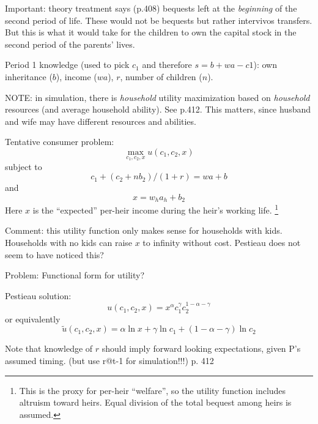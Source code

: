 \documentclass{article}
\begin{document}
Important:
theory treatment says (p.408) bequests left at the \emph{beginning} of the second period of life.
These would not be bequests but rather intervivos transfers.
But this is what it would take for the children to own the capital stock in the second period of the parents' lives.


Period 1 knowledge (used to pick $c_{1}$ and therefore $s = b+wa-c1$):
own inheritance ($b$),
income ($wa$),
$r$,
number of children ($n$).


NOTE: in simulation, there is \emph{household} utility maximization
based on \emph{household} resources (and average household ability).
See p.412.
This matters, since husband and wife may have different resources and abilities.


Tentative consumer problem:
\begin{equation}
\max_{c_{1},c_{2},x} u(c_{1}, c_{2}, x)
\end{equation}
subject to
\begin{equation}
c_{1} + (c_{2} + n b_{2})/(1+r) = w a + b
\label{Pestieau8} \tag{Pestieau 8}
\end{equation}
and
\begin{equation}
x = w_{h}a_{h}+ b_{2}
\end{equation}
Here $x$ is the ``expected'' per-heir income during the heir's working life.%
\footnote{%
This is the proxy for per-heir ``welfare'',
so the utility function includes altruism toward heirs.
Equal division of the total bequest among heirs is assumed.
} %
%

Comment: this utility function only makes sense for households with kids.
Households with no kids can raise $x$ to infinity without cost.
Pestieau does not seem to have noticed this?



Problem: Functional form for utility?

Pestieau solution:
\begin{equation}\label{utility_fn}
u(c_{1}, c_{2}, x) = x^{\alpha} c_{1}^{\gamma} c_{2}^{1-\alpha-\gamma}
\end{equation}
or equivalently
\begin{equation}\label{ln_utility_fn}
\tilde{u}(c_{1}, c_{2}, x) = \alpha \ln x +\gamma \ln c_{1} + (1-\alpha-\gamma) \ln c_{2}
\end{equation}


Note that knowledge of $r$ should imply forward looking expectations,
given P's assumed timing.
(but use r@t-1 for simulation!!!) p. 412
\end{document}
